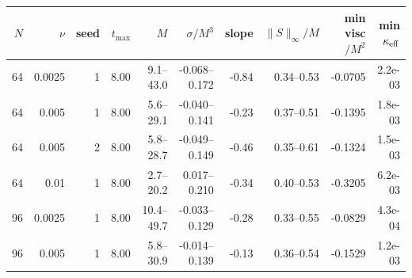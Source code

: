 \begin{center}\small\begin{tabular}{rrrrrrrrrr}
$N$&$\nu$&seed&$t_{\max}$&$M$&$\sigma/M^3$&slope&$\|S\|_\infty/M$&min visc$/M^2$&min $\kappa_{\rm eff}$\\\hline
64 & 0.0025 & 1 & 8.00 & 9.1--43.0 & -0.068--0.172 & -0.84 & 0.34--0.53 & -0.0705 & 2.2e-03 \\
64 & 0.005 & 1 & 8.00 & 5.6--29.1 & -0.040--0.141 & -0.23 & 0.37--0.51 & -0.1395 & 1.8e-03 \\
64 & 0.005 & 2 & 8.00 & 5.8--28.7 & -0.049--0.149 & -0.46 & 0.35--0.61 & -0.1324 & 1.5e-03 \\
64 & 0.01 & 1 & 8.00 & 2.7--20.2 & 0.017--0.210 & -0.34 & 0.40--0.53 & -0.3205 & 6.2e-03 \\
96 & 0.0025 & 1 & 8.00 & 10.4--49.7 & -0.033--0.129 & -0.28 & 0.33--0.55 & -0.0829 & 4.3e-04 \\
96 & 0.005 & 1 & 8.00 & 5.8--30.9 & -0.014--0.139 & -0.13 & 0.36--0.54 & -0.1529 & 1.2e-03 \\
\end{tabular}\end{center}
